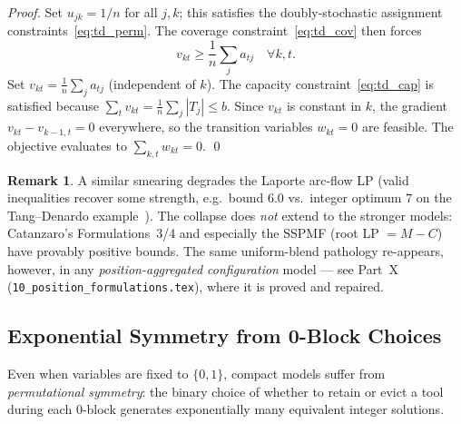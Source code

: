 \documentclass[11pt,a4paper]{article}
\theoremstyle{plain}
\theoremstyle{definition}
\newtheorem{remark}[theorem]{Remark}
\begin{document}
\begin{proofbox}
\begin{proof}
Set $u_{jk} = 1/n$ for all $j,k$; this satisfies the doubly-stochastic
assignment constraints~\eqref{eq:td_perm}. The coverage constraint~\eqref{eq:td_cov}
then forces
\[
  v_{kt} \ge \frac{1}{n}\sum_j a_{tj} \quad \forall k,t.
\]
Set $v_{kt} = \frac{1}{n}\sum_j a_{tj}$ (independent of $k$).
The capacity constraint~\eqref{eq:td_cap} is satisfied because
$\sum_t v_{kt} = \frac{1}{n}\sum_j |T_j| \le b$.
Since $v_{kt}$ is constant in $k$, the gradient $v_{kt}-v_{k-1,t}=0$ everywhere,
so the transition variables $w_{kt}=0$ are feasible.
The objective evaluates to $\sum_{k,t} w_{kt} = 0$. \qed
\end{proof}
\end{proofbox}

\begin{remark}
A similar smearing degrades the Laporte arc-flow LP (valid inequalities recover
some strength, e.g.\ bound $6.0$ vs.\ integer optimum $7$ on the Tang--Denardo
example~\cite{Laporte2004}). The collapse does \emph{not} extend to the stronger
models: Catanzaro's Formulations~3/4 and especially the SSPMF (root LP $=M-C$)
have provably positive bounds. The same uniform-blend pathology re-appears,
however, in any \emph{position-aggregated configuration} model --- see Part~X
(\texttt{10\_position\_formulations.tex}), where it is proved and repaired.
\end{remark}

\subsection{Exponential Symmetry from 0-Block Choices}

Even when variables are fixed to $\{0,1\}$, compact models suffer from
\emph{permutational symmetry}: the binary choice of whether to retain or evict
a tool during each 0-block generates exponentially many equivalent integer
solutions.
\end{document}
